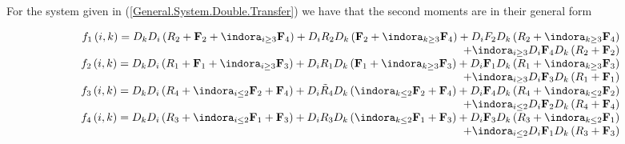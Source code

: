 \begin{Teo}
For the system given in (\ref{General.System.Double.Transfer}) we have that the second moments are in their general form

\begin{eqnarray}\label{Eq.Gral.Second.Order.Exhaustive}
\begin{array}{r}
f_{1}\left(i,k\right)=D_{k}D_{i}\left(R_{2}+\mathbf{F}_{2}+\indora_{i\geq3}\mathbf{F}_{4}\right)
+D_{i}R_{2}D_{k}\left(\mathbf{F}_{2}+\indora_{k\geq3}\mathbf{F}_{4}\right)
+D_{i}F_{2}D_{k}\left(R_{2}+\indora_{k\geq3}\mathbf{F}_{4}\right)\\
+\indora_{i\geq3}D_{i}\mathbf{F}_{4}D_{k}\left(R_{2}+\mathbf{F}_{2}\right)\\
f_{2}\left(i,k\right)=D_{k}D_{i}\left(R_{1}+\mathbf{F}_{1}+\indora_{i\geq3}\mathbf{F}_{3}\right)+D_{i}R_{1}D_{k}\left(\mathbf{F}_{1}+\indora_{k\geq3}\mathbf{F}_{3}\right)+D_{i}\mathbf{F}_{1}D_{k}\left(R_{1}+\indora_{k\geq3}\mathbf{F}_{3}\right)\\
+\indora_{i\geq3}D_{i}\mathbf{F}_{3}D_{k}\left(R_{1}+\mathbf{F}_{1}\right)\\
f_{3}\left(i,k\right)=D_{k}D_{i}\left(R_{4}+\indora_{i\leq2}\mathbf{F}_{2}+\mathbf{F}_{4}\right)+D_{i}\tilde{R}_{4}D_{k}\left(\indora_{k\leq2}\mathbf{F}_{2}+\mathbf{F}_{4}\right)+D_{i}\mathbf{F}_{4}D_{k}\left(R_{4}+\indora_{k\leq2}\mathbf{F}_{2}\right)\\
+\indora_{i\leq2}D_{i}\mathbf{F}_{2}D_{k}\left(R_{4}+\mathbf{F}_{4}\right)\\
f_{4}\left(i,k\right)=D_{k}D_{i}\left(R_{3}+\indora_{i\leq2}\mathbf{F}_{1}+\mathbf{F}_{3}\right)+D_{i}R_{3}D_{k}\left(\indora_{k\leq2}\mathbf{F}_{1}+\mathbf{F}_{3}\right)+D_{i}\mathbf{F}_{3}D_{k}\left(R_{3}+\indora_{k\leq2}\mathbf{F}_{1}\right)\\
+\indora_{i\leq2}D_{i}\mathbf{F}_{1}D_{k}\left(R_{3}+\mathbf{F}_{3}\right)
\end{array}
\end{eqnarray}%

\end{Teo}


